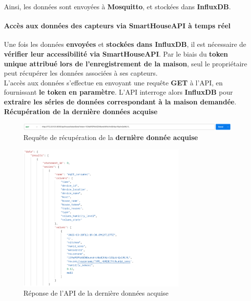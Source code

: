 \documentclass[10pt, a4paper]{report}
\begin{document}
		Ainsi, les données sont envoyées à \textbf{Mosquitto}, et stockées dans \textbf{InfluxDB}.
		
		
	\paragraph{Accès aux données des capteurs via SmartHouseAPI à temps réel\\}
	Une fois les données \textbf{envoyées} et \textbf{stockées dans InfluxDB}, il est nécessaire de \textbf{vérifier leur accessibilité via SmartHouseAPI}. Par le biais du \textbf{token unique attribué lors de l’enregistrement de la maison}, seul le propriétaire peut récupérer les données associées à ses capteurs.\\
	
	L’accès aux données s’effectue en envoyant une requête \textbf{GET} à l’API, en fournissant \textbf{le token en paramètre}. L’API interroge alors \textbf{InfluxDB} pour \textbf{extraire les séries de données correspondant à la maison demandée}.\\
	
	\textbf{Récupération de la dernière données acquise}
	\begin{figure}[h!]
		\centering
		\includegraphics[width=1\textwidth]{ressources/img/preuves/lastDataRequete}
		\caption{Requête de récupération de la \textbf{dernière donnée acquise}}
		\label{fig:lastDataRequete}
	\end{figure}
	
	\newpage
	
	\begin{figure}[h!]
		\centering
		\includegraphics[width=0.75\textwidth]{ressources/img/preuves/lastDataReponse}
		\caption{Réponse de l'API de la dernière données acquise}
		\label{fig:lastDataReponse}
	\end{figure}
	
\end{document}
